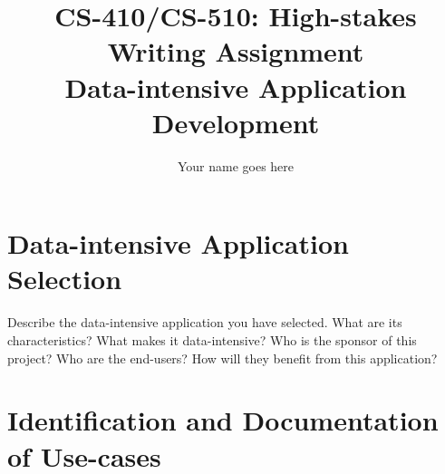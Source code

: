 \documentclass[11pt]{article}
\title{CS-410/CS-510: High-stakes Writing Assignment \\ Data-intensive Application Development}
\author{Your name goes here}
\date{ }
\begin{document}
\maketitle
\vspace*{-0.25in}
\thispagestyle{empty}
\tableofcontents
\newpage



\section{Data-intensive Application Selection} \label{sec:dia}




Describe the data-intensive application you have selected. What are its characteristics? What makes it data-intensive? Who is the sponsor of this project? Who are the end-users? How will they benefit from this application?




\section{Identification and Documentation of Use-cases} \label{sec:use-cases}

\end{document}

